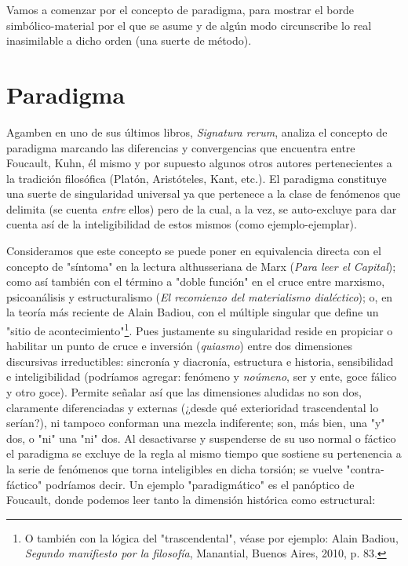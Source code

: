 \documentclass{book}
\begin{document}
Vamos a comenzar por el concepto de paradigma, para mostrar el borde
simbólico-material por el que se asume y de algún modo circunscribe lo
real inasimilable a dicho orden (una suerte de método).

\section{Paradigma}

Agamben en uno de sus últimos libros, \emph{Signatura rerum}, analiza el
concepto de paradigma marcando las diferencias y convergencias que
encuentra entre Foucault, Kuhn, él mismo y por supuesto algunos otros
autores pertenecientes a la tradición filosófica (Platón, Aristóteles,
Kant, etc.). El paradigma constituye una suerte de singularidad
universal ya que pertenece a la clase de fenómenos que delimita (se
cuenta \emph{entre} ellos) pero de la cual, a la vez, se auto-excluye
para dar cuenta así de la inteligibilidad de estos mismos (como
ejemplo-ejemplar).

Consideramos que este concepto se puede poner en equivalencia directa
con el concepto de "síntoma" en la lectura althusseriana de Marx
(\emph{Para leer el Capital}); como así también con el término a "doble
función" en el cruce entre marxismo, psicoanálisis y estructuralismo
(\emph{El recomienzo del materialismo dialéctico}); o, en la teoría más
reciente de Alain Badiou, con el múltiple singular que define un "sitio
de acontecimiento"\footnote{O también con la lógica del "trascendental",
  véase por ejemplo: Alain Badiou, \emph{Segundo manifiesto por la
  filosofía}, Manantial, Buenos Aires, 2010, p. 83.}. Pues justamente su
singularidad reside en propiciar o habilitar un punto de cruce e
inversión (\emph{quiasmo}) entre dos dimensiones discursivas
irreductibles: sincronía y diacronía, estructura e historia,
sensibilidad e inteligibilidad (podríamos agregar: fenómeno y
\emph{noúmeno}, ser y ente, goce fálico y otro goce). Permite señalar
así que las dimensiones aludidas no son dos, claramente diferenciadas y
externas (¿desde qué exterioridad trascendental lo serían?), ni tampoco
conforman una mezcla indiferente; son, más bien, una "y" dos, o "ni" una
"ni" dos. Al desactivarse y suspenderse de su uso normal o fáctico el
paradigma se excluye de la regla al mismo tiempo que sostiene su
pertenencia a la serie de fenómenos que torna inteligibles en dicha
torsión; se vuelve "contra-fáctico" podríamos decir. Un ejemplo
"paradigmático" es el panóptico de Foucault, donde podemos leer tanto la
dimensión histórica como estructural:
\end{document}
